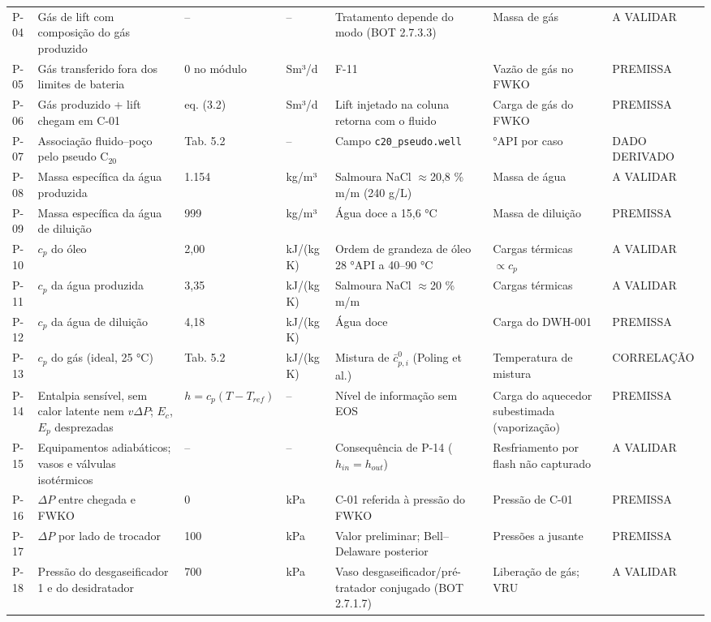 \documentclass[11pt,a4paper]{article}
\numberwithin{equation}{section}
\numberwithin{table}{section}
\numberwithin{figure}{section}
\newcommand{\tipo}[1]{\textsf{\footnotesize #1}}
\newcommand{\AV}{\textcolor{red!70!black}{\tipo{A VALIDAR}}}
\begin{document}
\begin{landscape}
\begin{longtable}{lL{5.2cm}L{2.4cm}lL{5.4cm}L{4.0cm}l}
P-04 & Gás de lift com composição do gás produzido & -- & -- & Tratamento depende do modo (BOT 2.7.3.3) & Massa de gás & \AV\\
P-05 & Gás transferido fora dos limites de bateria & 0 no módulo & Sm³/d & F-11 & Vazão de gás no FWKO & \tipo{PREMISSA}\\
P-06 & Gás produzido + lift chegam em C-01 & eq. (3.2) & Sm³/d & Lift injetado na coluna retorna com o fluido & Carga de gás do FWKO & \tipo{PREMISSA}\\
P-07 & Associação fluido--poço pelo pseudo C$_{20}$ & Tab. 5.2 & -- & Campo \texttt{c20\_pseudo.well} & °API por caso & \tipo{DADO DERIVADO}\\
P-08 & Massa específica da água produzida & 1.154 & kg/m³ & Salmoura NaCl $\approx$20,8 \% m/m (240 g/L) & Massa de água & \AV\\
P-09 & Massa específica da água de diluição & 999 & kg/m³ & Água doce a 15,6 °C & Massa de diluição & \tipo{PREMISSA}\\
P-10 & $c_p$ do óleo & 2{,}00 & kJ/(kg K) & Ordem de grandeza de óleo 28 °API a 40--90 °C & Cargas térmicas $\propto c_p$ & \AV\\
P-11 & $c_p$ da água produzida & 3{,}35 & kJ/(kg K) & Salmoura NaCl $\approx$20 \% m/m & Cargas térmicas & \AV\\
P-12 & $c_p$ da água de diluição & 4{,}18 & kJ/(kg K) & Água doce & Carga do DWH-001 & \tipo{PREMISSA}\\
P-13 & $c_p$ do gás (ideal, 25 °C) & Tab. 5.2 & kJ/(kg K) & Mistura de $\bar c^{0}_{p,i}$ (Poling et al.) & Temperatura de mistura & \tipo{CORRELAÇÃO}\\
P-14 & Entalpia sensível, sem calor latente nem $v\Delta P$; $E_c$, $E_p$ desprezadas & $h=c_p(T-T_{ref})$ & -- & Nível de informação sem EOS & Carga do aquecedor subestimada (vaporização) & \tipo{PREMISSA}\\
P-15 & Equipamentos adiabáticos; vasos e válvulas isotérmicos & -- & -- & Consequência de P-14 ($h_{in}=h_{out}$) & Resfriamento por flash não capturado & \AV\\
P-16 & $\Delta P$ entre chegada e FWKO & 0 & kPa & C-01 referida à pressão do FWKO & Pressão de C-01 & \tipo{PREMISSA}\\
P-17 & $\Delta P$ por lado de trocador & 100 & kPa & Valor preliminar; Bell--Delaware posterior & Pressões a jusante & \tipo{PREMISSA}\\
P-18 & Pressão do desgaseificador 1 e do desidratador & 700 & kPa & Vaso desgaseificador/pré-tratador conjugado (BOT 2.7.1.7) & Liberação de gás; VRU & \AV\\

\end{longtable}
\end{landscape}
\end{document}
